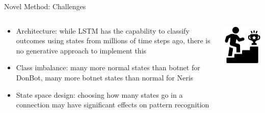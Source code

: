 \documentclass[pdf]{beamer}
\begin{document}
\begin{frame}[fragile]{Novel Method: Challenges}
\begin{minipage}[0.2\textheight]{\textwidth}
\begin{columns}[T]
\begin{column}{0.5\textwidth}
\begin{itemize}
\item Architecture: while LSTM has the capability to classify outcomes using states from millions of time steps ago, there is no generative approach to implement this
\item Class imbalance: many more normal states than botnet for DonBot, many more botnet states than normal for Neris
\item State space design: choosing how many states go in a connection may have significant effects on pattern recognition
\end{itemize}
\end{column}
\begin{column}{0.5\textwidth}
\includegraphics[width=5cm]{Images/challenge.png}
\end{column}
\end{columns}
\end{minipage}
\end{frame}
\end{document}
